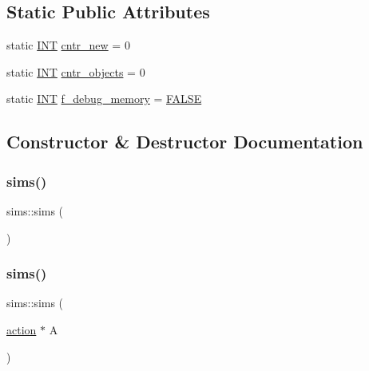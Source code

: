 \subsection*{Static Public Attributes}
\begin{DoxyCompactItemize}
\item 
static \mbox{\hyperlink{galois_8h_a09fddde158a3a20bd2dcadb609de11dc}{I\+NT}} \mbox{\hyperlink{classsims_a5a4fcca6f8e8ce09f1871329c7e51fc4}{cntr\+\_\+new}} = 0
\item 
static \mbox{\hyperlink{galois_8h_a09fddde158a3a20bd2dcadb609de11dc}{I\+NT}} \mbox{\hyperlink{classsims_a1b551ca3bc8411d979e64b65a67855c9}{cntr\+\_\+objects}} = 0
\item 
static \mbox{\hyperlink{galois_8h_a09fddde158a3a20bd2dcadb609de11dc}{I\+NT}} \mbox{\hyperlink{classsims_a903d1be5cbcbfdcaabf491fb30bb2e54}{f\+\_\+debug\+\_\+memory}} = \mbox{\hyperlink{nauty_8h_aa93f0eb578d23995850d61f7d61c55c1}{F\+A\+L\+SE}}
\end{DoxyCompactItemize}


\subsection{Constructor \& Destructor Documentation}
\mbox{\label{classsims_ab96260ec513fe30c37c7a1933f4d6e7f}} 
\subsubsection{\texorpdfstring{sims()}{sims()}\hspace{0.1cm}{\footnotesize\ttfamily [1/2]}}
{\footnotesize\ttfamily sims\+::sims (\begin{DoxyParamCaption}{ }\end{DoxyParamCaption})}

\mbox{\label{classsims_a2eada2ad0e325eabb600f63769400b27}} 
\subsubsection{\texorpdfstring{sims()}{sims()}\hspace{0.1cm}{\footnotesize\ttfamily [2/2]}}
{\footnotesize\ttfamily sims\+::sims (\begin{DoxyParamCaption}\item[{\mbox{\hyperlink{classaction}{action}} $\ast$}]{A }\end{DoxyParamCaption})}

